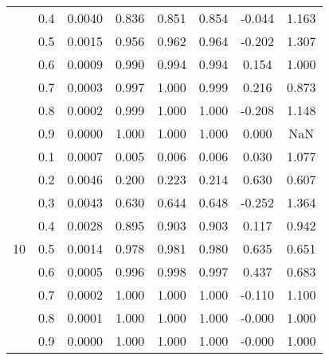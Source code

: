 \documentclass[11pt,a4paper]{report}
\begin{document}
\begin{longtable}{ | c | c || c | c | c | c | c | c | }
 & 0.4 & 0.0040 & 0.836 & 0.851 & 0.854 & -0.044 & 1.163 \\
 & 0.5 & 0.0015 & 0.956 & 0.962 & 0.964 & -0.202 & 1.307 \\
 & 0.6 & 0.0009 & 0.990 & 0.994 & 0.994 & 0.154 & 1.000 \\
 & 0.7 & 0.0003 & 0.997 & 1.000 & 0.999 & 0.216 & 0.873 \\
 & 0.8 & 0.0002 & 0.999 & 1.000 & 1.000 & -0.208 & 1.148 \\
 & 0.9 & 0.0000 & 1.000 & 1.000 & 1.000 & 0.000 & NaN \\
 \hline
\multirow{9}{*}{10} & 0.1 & 0.0007 & 0.005 & 0.006 & 0.006 & 0.030 & 1.077 \\
 & 0.2 & 0.0046 & 0.200 & 0.223 & 0.214 & 0.630 & 0.607 \\
 & 0.3 & 0.0043 & 0.630 & 0.644 & 0.648 & -0.252 & 1.364 \\
 & 0.4 & 0.0028 & 0.895 & 0.903 & 0.903 & 0.117 & 0.942 \\
 & 0.5 & 0.0014 & 0.978 & 0.981 & 0.980 & 0.635 & 0.651 \\
 & 0.6 & 0.0005 & 0.996 & 0.998 & 0.997 & 0.437 & 0.683 \\
 & 0.7 & 0.0002 & 1.000 & 1.000 & 1.000 & -0.110 & 1.100 \\
 & 0.8 & 0.0001 & 1.000 & 1.000 & 1.000 & -0.000 & 1.000 \\
 & 0.9 & 0.0000 & 1.000 & 1.000 & 1.000 & -0.000 & 1.000 \\
 \hline
\hline
\end{longtable}
\end{document}
